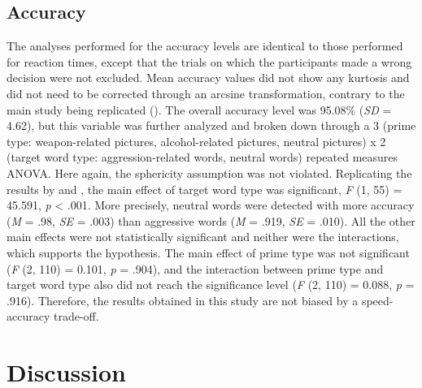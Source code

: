 \documentclass[serif, authorddate, twocolumn, empirical]{jote-article}
\begin{document}
{}
\subsection*{Accuracy}
The analyses performed for the accuracy levels are identical to those performed for reaction times, except that the trials on which the participants made a wrong decision were not excluded. Mean accuracy values did not show any kurtosis and did not need to be corrected through an arcsine transformation, contrary to the main study being replicated (\cite{BartholowHeinz2006}). The overall accuracy level was 95.08$\%$  (\textit{SD }= 4.62), but this variable was further analyzed and broken down through a 3 (prime type: weapon-related pictures, alcohol-related pictures, neutral pictures) x 2 (target word type: aggression-related words, neutral words) repeated measures ANOVA. Here again, the sphericity assumption was not violated. Replicating the results by \textcite{BartholowHeinz2006} and \textcite{SubraMullerBegueLBushmanDelmas2010}, the main effect of target word type was significant, \textit{F }(1, 55) = 45.591, \textit{p }< .001. More precisely, neutral words were detected with more accuracy (\textit{M }= .98, \textit{SE }= .003) than aggressive words (\textit{M }= .919, \textit{SE }= .010). All the other main effects were not statistically significant and neither were the interactions, which supports the hypothesis. The main effect of prime type was not significant (\textit{F} (2, 110) = 0.101, \textit{p }= .904), and the interaction between prime type and target word type also did not reach the significance level (\textit{F }(2, 110) = 0.088, \textit{p }= .916). Therefore, the results obtained in this study are not biased by a speed-accuracy trade-off.  

{}
\section*{Discussion} %
\label{sec:discussion}
\end{document}
